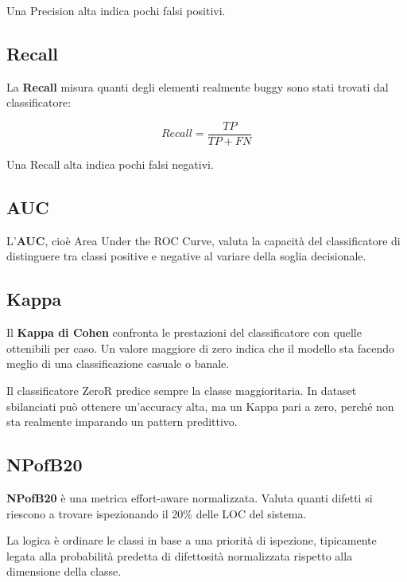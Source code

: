 Una Precision alta indica pochi falsi positivi.

\subsection{Recall}

La \textbf{Recall} misura quanti degli elementi realmente buggy sono stati trovati dal classificatore:

\[
Recall = \frac{TP}{TP + FN}
\]

Una Recall alta indica pochi falsi negativi.

\subsection{AUC}

L'\textbf{AUC}, cioè Area Under the ROC Curve, valuta la capacità del classificatore di distinguere tra classi positive e negative al variare della soglia decisionale.

\subsection{Kappa}

Il \textbf{Kappa di Cohen} confronta le prestazioni del classificatore con quelle ottenibili per caso. Un valore maggiore di zero indica che il modello sta facendo meglio di una classificazione casuale o banale.

\begin{notaprof}
Il classificatore ZeroR predice sempre la classe maggioritaria. In dataset sbilanciati può ottenere un'accuracy alta, ma un Kappa pari a zero, perché non sta realmente imparando un pattern predittivo.
\end{notaprof}

\subsection{NPofB20}

\begin{notaslide}
\textbf{NPofB20} è una metrica effort-aware normalizzata. Valuta quanti difetti si riescono a trovare ispezionando il 20\% delle LOC del sistema.
\end{notaslide}

La logica è ordinare le classi in base a una priorità di ispezione, tipicamente legata alla probabilità predetta di difettosità normalizzata rispetto alla dimensione della classe.

